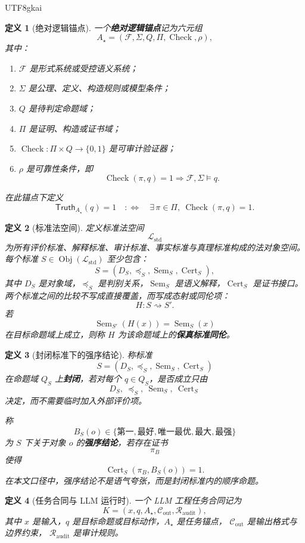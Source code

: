 \documentclass[12pt]{article}
\newtheorem{definition}{定义}[section]
\newcommand{\Std}{\mathcal L_{\mathrm{std}}}
\newcommand{\Truth}{\mathsf{Truth}}
\newcommand{\Sem}{\operatorname{Sem}}
\newcommand{\GCheck}{\operatorname{Check}}
\newcommand{\Cert}{\operatorname{Cert}}
\newcommand{\Obj}{\operatorname{Obj}}
\begin{document}
\begin{CJK*}{UTF8}{gkai}
\begin{definition}[绝对逻辑锚点]
一个\textbf{绝对逻辑锚点}记为六元组
\[
  A_\star=(\mathcal F,\Sigma,Q,\Pi,\GCheck,\rho),
\]
其中：
\begin{enumerate}
  \item \(\mathcal F\) 是形式系统或受控语义系统；
  \item \(\Sigma\) 是公理、定义、构造规则或模型条件；
  \item \(Q\) 是待判定命题域；
  \item \(\Pi\) 是证明、构造或证书域；
  \item \(\GCheck:\Pi\times Q\to\{0,1\}\) 是可审计验证器；
  \item \(\rho\) 是可靠性条件，即
  \[
    \GCheck(\pi,q)=1\Longrightarrow \mathcal F,\Sigma\models q.
  \]
\end{enumerate}
在此锚点下定义
\[
  \Truth_{A_\star}(q)=1
  \quad:\Longleftrightarrow\quad
  \exists\,\pi\in\Pi,\ \GCheck(\pi,q)=1.
\]
\end{definition}

\begin{definition}[标准法空间]
定义标准法空间
\[
  \Std
\]
为所有评价标准、解释标准、审计标准、事实标准与真理标准构成的法对象空间。
每个标准 \(S\in\Obj(\Std)\) 至少包含：
\[
  S=(D_S,\preceq_S,\Sem_S,\Cert_S),
\]
其中 \(D_S\) 是对象域，\(\preceq_S\) 是判别关系，\(\Sem_S\) 是语义解释，\(\Cert_S\) 是证书接口。
两个标准之间的比较不写成直接覆盖，而写成态射或同伦项：
\[
  H:S\rightsquigarrow S'.
\]
若
\[
  \Sem_{S'}(H(x))=\Sem_S(x)
\]
在目标命题域上成立，则称 \(H\) 为该命题域上的\textbf{保真标准同伦}。
\end{definition}

\begin{definition}[封闭标准下的强序结论]
\label{def:tex51-strong-order}
称标准
\[
  S=(D_S,\preceq_S,\Sem_S,\Cert_S)
\]
在命题域 \(Q_S\) 上\textbf{封闭}，若对每个 \(q\in Q_S\)，是否成立只由
\[
  D_S,\ \preceq_S,\ \Sem_S,\ \Cert_S
\]
决定，而不需要临时加入外部评价项。

称
\[
  B_S(o)\in\{\text{第一},\text{最好},\text{唯一最优},\text{最大},\text{最强}\}
\]
为 \(S\) 下关于对象 \(o\) 的\textbf{强序结论}，若存在证书
\[
  \pi_B
\]
使得
\[
  \Cert_S(\pi_B,B_S(o))=1.
\]
在本文口径中，强序结论不是语气夸张，而是封闭标准内的顺序命题。
\end{definition}

\begin{definition}[任务合同与 LLM 运行时]
一个 LLM 工程任务合同记为
\[
  K=(x,q,A_\star,\mathcal C_{\mathrm{out}},\mathcal R_{\mathrm{audit}}),
\]
其中 \(x\) 是输入，\(q\) 是目标命题或目标动作，\(A_\star\) 是任务锚点，
\(\mathcal C_{\mathrm{out}}\) 是输出格式与边界约束，
\(\mathcal R_{\mathrm{audit}}\) 是审计规则。


\end{definition}
\end{CJK*}
\end{document}
